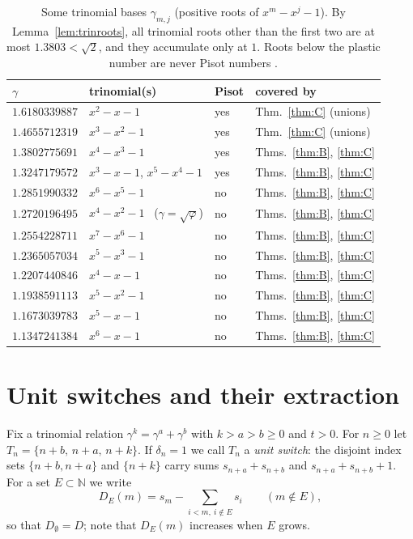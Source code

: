 \documentclass[11pt]{amsart}
\theoremstyle{definition}
\theoremstyle{remark}
\newcommand{\N}{\mathbb{N}}
\begin{document}
\begin{table}[ht]
\centering
\small
\begin{tabular}{llll}
\toprule
$\gamma$ & trinomial(s) & Pisot & covered by \\
\midrule
$1.6180339887$ & $x^2-x-1$ & yes & Thm.~\ref{thm:C} (unions) \\
$1.4655712319$ & $x^3-x^2-1$ & yes & Thm.~\ref{thm:C} (unions) \\
$1.3802775691$ & $x^4-x^3-1$ & yes & Thms.~\ref{thm:B}, \ref{thm:C} \\
$1.3247179572$ & $x^3-x-1$, $x^5-x^4-1$ & yes & Thms.~\ref{thm:B}, \ref{thm:C} \\
$1.2851990332$ & $x^6-x^5-1$ & no & Thms.~\ref{thm:B}, \ref{thm:C} \\
$1.2720196495$ & $x^4-x^2-1$ \ ($\gamma=\sqrt\varphi$) & no & Thms.~\ref{thm:B}, \ref{thm:C} \\
$1.2554228711$ & $x^7-x^6-1$ & no & Thms.~\ref{thm:B}, \ref{thm:C} \\
$1.2365057034$ & $x^5-x^3-1$ & no & Thms.~\ref{thm:B}, \ref{thm:C} \\
$1.2207440846$ & $x^4-x-1$ & no & Thms.~\ref{thm:B}, \ref{thm:C} \\
$1.1938591113$ & $x^5-x^2-1$ & no & Thms.~\ref{thm:B}, \ref{thm:C} \\
$1.1673039783$ & $x^5-x-1$ & no & Thms.~\ref{thm:B}, \ref{thm:C} \\
$1.1347241384$ & $x^6-x-1$ & no & Thms.~\ref{thm:B}, \ref{thm:C} \\
\bottomrule
\end{tabular}
\caption{Some trinomial bases $\gamma_{m,j}$ (positive roots of $x^m-x^j-1$). By
Lemma~\ref{lem:trinroots}, all trinomial roots other than the first two are at most
$1.3803<\sqrt2$, and they accumulate only at $1$. Roots below the plastic number are never
Pisot numbers \cite{Sie44}.}
\label{tab:roots}
\end{table}

\section{Unit switches and their extraction}\label{sec:extract}

Fix a trinomial relation $\gamma^k=\gamma^a+\gamma^b$ with $k>a>b\ge0$ and $t>0$. For $n\ge0$
let $T_n=\{n+b,\,n+a,\,n+k\}$. If $\delta_n=1$ we call $T_n$ a \emph{unit switch}: the
disjoint index sets $\{n+b,n+a\}$ and $\{n+k\}$ carry sums $s_{n+a}+s_{n+b}$ and
$s_{n+a}+s_{n+b}+1$. For a set $E\subset\N$ we write
\[
  D_E(m)=s_m-\sum_{i<m,\ i\notin E}s_i\qquad(m\notin E),
\]
so that $D_\emptyset=D$; note that $D_E(m)$ increases when $E$ grows.
\end{document}
